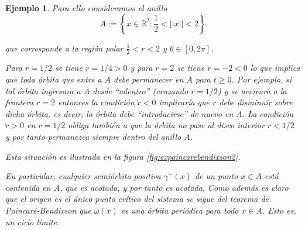 \documentclass[11pt]{book}
\theoremstyle{definition}
\numberwithin{definition}{section}
\theoremstyle{theorem}
\numberwithin{theorem}{section}
\numberwithin{lemma}{section}
\numberwithin{corollary}{section}
\theoremstyle{plain}
\newtheorem{example}{Ejemplo}
\numberwithin{example}{section}
\newcommand{\R}{{\ensuremath{\mathbb{R}}}}
\begin{document}
\begin{example}
Para ello consideramos el anillo
$$ A := \left\{ x \in \R^2 : \frac{1}{2} < ||x|| < 2 \right\} $$

que corresponde a la región polar $\frac{1}{2} < r < 2$ y $\theta \in [0,2\pi]$.

Para $r = 1/2$ se tiene $\dot{r} = 1/4 > 0$ y para $r = 2$ se tiene $\dot{r} = -2 < 0$ lo que implica que toda órbita que entre a $A$ debe permanecer en $A$ para $t \geq 0$.
Por ejemplo, si tal órbita ingresara a $A$ desde ``adentro'' (cruzando $r = 1/2$) y se acercara a la frontera $r = 2$ entonces la condición $\dot{r} < 0$ implicaría que $r$ debe disminuir sobre dicha órbita, es decir, la órbita debe ``introducirse'' de nuevo en $A$. La condición $\dot{r} > 0$ en $r = 1/2$ obliga también a que la órbita no pase al disco interior $r < 1/2$ y por tanto permanezca siempre dentro del anillo $A$.

Esta situación es ilustrada en la figura \ref{fig:expoincarebendixson2}.

En particular, cualquier semiórbita positiva $\gamma^+(x)$ de un punto $x \in A$ está contenida en $A$, que es acotado, y por tanto es acotada. Como además es claro que el origen es el único punto crítico del sistema se sigue del teorema de Poincaré-Bendixson que $\omega(x)$ es una órbita periódica para todo $x \in A$. Esto es, un ciclo límite.


\end{example}
\end{document}

